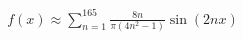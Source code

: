 \documentclass[preview]{standalone}
\begin{document}
\begin{align*}
f(x) \approx \sum_{n=1}^{165} \frac{8n}{\pi(4n^2-1)} \sin(2nx)
\end{align*}
\end{document}
